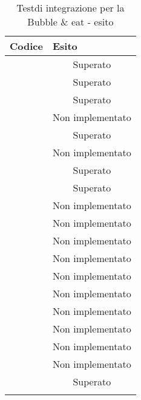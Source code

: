 \begin{longtable}{|c|c|}
	\hline \multicolumn{1}{|l|}{\textbf{Codice}} & \multicolumn{1}{l|}{\textbf{Esito}}
	\\
	\hline \testt{} & Superato\\
	\hline \testt{} & Superato\\
	\hline \testt{} & Superato\\
	\hline \testt{} & Non implementato\\
	\hline \testt{} & Superato\\
	\hline \testt{} & Non implementato\\
	\hline \testt{} & Superato\\
	\hline \testt{} & Superato\\
	\hline \testt{} & Non implementato\\
	\hline \testt{} & Non implementato\\
	\hline \testt{} & Non implementato\\
	\hline \testt{} & Non implementato\\
	\hline \testt{} & Non implementato\\
	\hline \testt{} & Non implementato\\
	\hline \testt{} & Non implementato\\
	\hline \testt{} & Non implementato\\
	\hline \testt{} & Non implementato\\
	\hline \testt{} & Non implementato\\
	\hline \testt{} & Superato\\
	\hline
	\caption{Testdi integrazione per la Bubble \& eat - esito}
\end{longtable}
